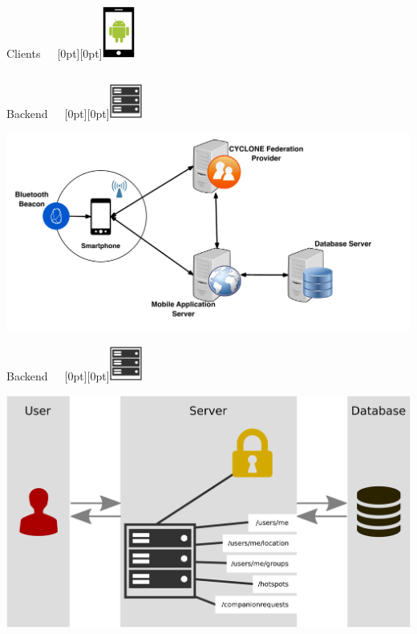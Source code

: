 \documentclass[11pt]{beamer}
\begin{document}
\begin{frame}{Clients~~~\raisebox{-10pt}[0pt][0pt]{\includegraphics[width=0.08\textwidth]{tech-stack-android}}}
\begin{columns}[T]
\begin{column}{.4\textwidth}
	\end{column}
\end{columns}
\end{frame}



\begin{frame}{Backend~~~\raisebox{-6pt}[0pt][0pt]{\includegraphics[width=0.08\textwidth]{tech-stack-backend}}}

  \begin{center}
    \includegraphics[width=\textwidth]{architecture}
  \end{center}

\end{frame}

\begin{frame}{Backend~~~\raisebox{-6pt}[0pt][0pt]{\includegraphics[width=0.08\textwidth]{tech-stack-backend}}}

  \begin{center}
    \includegraphics[width=\textwidth]{backend}
  \end{center}

\end{frame}
\end{document}
